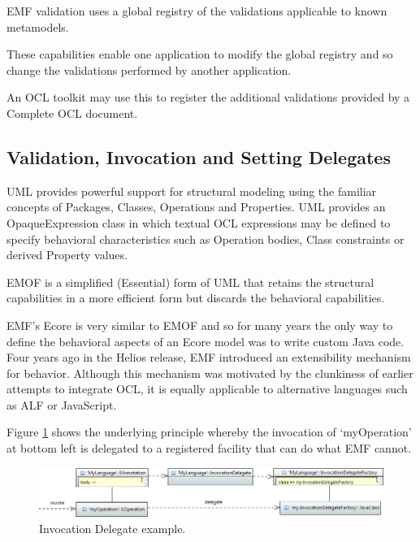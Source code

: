 \documentclass[a4paper]{article}
\begin{document}
EMF validation uses a global registry of the validations applicable to known metamodels.

These capabilities enable one application to modify the global registry and so change the validations performed by another application.

An OCL toolkit may use this to register the additional validations provided by a Complete OCL document.

\subsection{Validation, Invocation and Setting Delegates}

UML provides powerful support for structural modeling using the  familiar concepts of Packages, Classes, Operations and Properties. UML provides an OpaqueExpression class in which textual OCL expressions may be defined to specify behavioral characteristics such as Operation bodies, Class constraints or derived Property values.

EMOF is a simplified (Essential) form of UML that retains the structural capabilities in a more efficient form but discards the behavioral capabilities.

EMF's Ecore is very similar to EMOF and so for many years the only way to define the behavioral aspects of an Ecore model was to write custom Java code. Four years ago in the Helios release, EMF introduced an extensibility mechanism for behavior. Although this mechanism was motivated by the clunkiness of earlier attempts to integrate OCL, it is equally applicable to alternative languages such as ALF or JavaScript. 

Figure \ref{fig:InvocationDelegate} shows the underlying principle whereby the invocation of `myOperation' at bottom left is delegated to a registered facility that can do what EMF cannot. 

\begin{figure}
  \begin{center}
    \includegraphics[width=6.75in]{InvocationDelegate.png}
  \end{center}
  \caption{Invocation Delegate example.}
  \label{fig:InvocationDelegate}
\end{figure}
\end{document}

